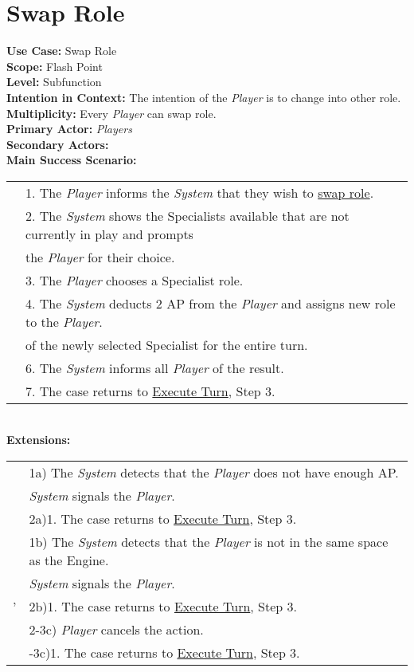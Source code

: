 \documentclass{article}
\begin{document}
	\section*{Swap Role}
	\textbf{Use Case:} Swap Role\\
	\textbf{Scope:} Flash Point\\
	\textbf{Level:} Subfunction\\
	\textbf{Intention in Context:} The intention of the \textit{Player} is to change into other role.\\
	\textbf{Multiplicity: }Every \textit{Player} can swap role.\\
	\textbf{Primary Actor:} \textit{Players}\\
	\textbf{Secondary Actors:}\\
	\textbf{Main Success Scenario:}\\
	\begin{tabular}{l l}
		&1. The \textit{Player} informs the \textit{System} that they wish to \underline{swap role}.\\
		&2. The \textit{System} shows the Specialists available that are not currently in play and prompts\\ &\qquad the \textit{Player} for their choice.\\
		&3. The \textit{Player} chooses a Specialist role.\\
		&4. The \textit{System} deducts 2 AP from the \textit{Player} and assigns new role to the \textit{Player}.\\
		&\qquad of the newly selected Specialist for the entire turn.\\
		&6. The \textit{System} informs all \textit{Player} of the result.\\
		&7. The case returns to \underline{Execute Turn}, Step 3.
	\end{tabular}\\
	\textbf{Extensions:}\\
	\begin{tabular}{l l}
		&1a) The \textit{System} detects that the \textit{Player} does not have enough AP.\\ &\qquad\textit{System} signals the \textit{Player}.\\
		&\qquad2a)1. The case returns to \underline{Execute Turn}, Step 3.\\
		&1b) The \textit{System} detects that the \textit{Player} is not in the same space as the Engine.\\
		&\qquad\textit{System} signals the \textit{Player}.\\'
		&\qquad2b)1. The case returns to \underline{Execute Turn}, Step 3.\\
		&2-3c) \textit{Player} cancels the action.\\
		&\qquad2-3c)1. The case returns to \underline{Execute Turn}, Step 3.
	\end{tabular}\\
	
\end{document}
